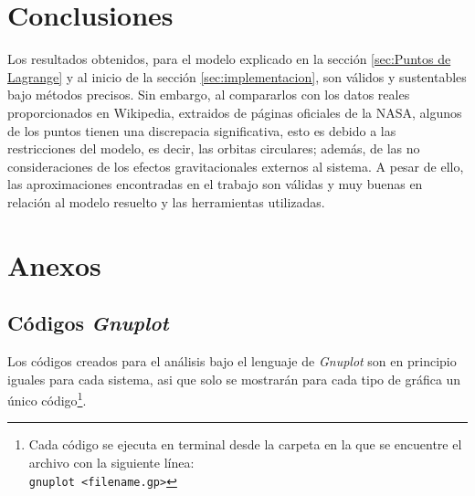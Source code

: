 \section{Conclusiones}
\label{sec:conclusiones}

Los resultados obtenidos, para el modelo explicado en la sección \ref{sec:Puntos de Lagrange} y al inicio de la sección \ref{sec:implementacion}, son válidos y sustentables bajo métodos precisos. Sin embargo, al compararlos con los datos reales proporcionados en Wikipedia, extraidos de páginas oficiales de la NASA, algunos de los puntos tienen una discrepacia significativa, esto es debido a las restricciones del modelo, es decir, las orbitas circulares; además, de las no consideraciones de los efectos gravitacionales externos al sistema. A pesar de ello, las aproximaciones encontradas en el trabajo son válidas y muy buenas en relación al modelo resuelto y las herramientas utilizadas.


\section{Anexos}
\label{sec:anexos}

\subsection{Códigos \textit{Gnuplot}}
Los códigos creados para el análisis bajo el lenguaje de \textit{Gnuplot} son en principio iguales para cada sistema, asi que solo se mostrarán para cada tipo de gráfica un único código\footnote{Cada código se ejecuta en terminal desde la carpeta en la que se encuentre el archivo con la siguiente línea: \\
\texttt{gnuplot <filename.gp>}}. \vspace*{0.2cm}

